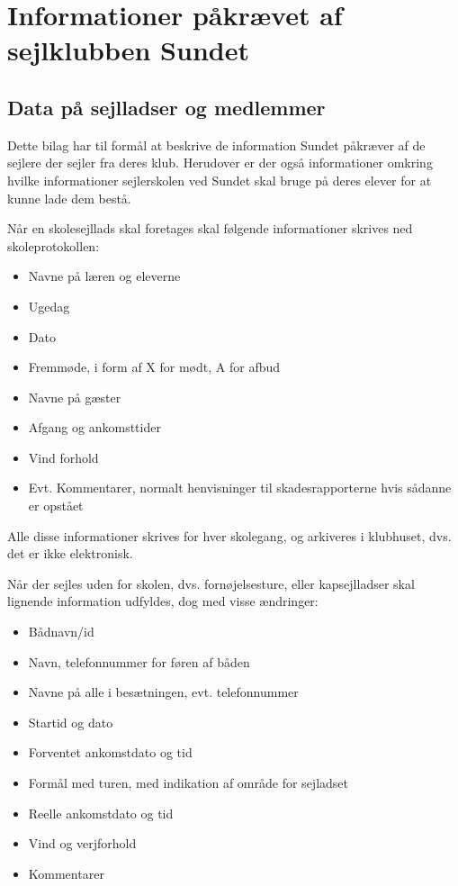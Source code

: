 \chapter{Informationer påkrævet af sejlklubben Sundet}\label{bilag:sundet}

\section{Data på sejlladser og medlemmer}

Dette bilag har til formål at beskrive de information Sundet påkræver af de sejlere der sejler fra deres klub. Herudover er der også informationer omkring hvilke informationer sejlerskolen ved Sundet skal bruge på deres elever for at kunne lade dem bestå.

Når en skolesejllads skal foretages skal følgende informationer skrives ned skoleprotokollen:

\begin{itemize}
	\item Navne på læren og eleverne
	\item Ugedag
	\item Dato
	\item Fremmøde, i form af X for mødt, A for afbud
	\item Navne på gæster
	\item Afgang og ankomsttider
	\item Vind forhold
	\item Evt. Kommentarer, normalt henvisninger til skadesrapporterne hvis sådanne er opstået
\end{itemize}

Alle disse informationer skrives for hver skolegang, og arkiveres i klubhuset, dvs. det er ikke elektronisk.

Når der sejles uden for skolen, dvs. fornøjelsesture, eller kapsejlladser skal lignende information udfyldes, dog med visse ændringer:

\begin{itemize}
	\item Bådnavn/id
	\item Navn, telefonnummer for føren af båden
	\item Navne på alle i besætningen, evt. telefonnummer
	\item Startid og dato
	\item Forventet ankomstdato og tid
	\item Formål med turen, med indikation af område for sejladset
	\item Reelle ankomstdato og tid
	\item Vind og verjforhold
	\item Kommentarer
\end{itemize}

